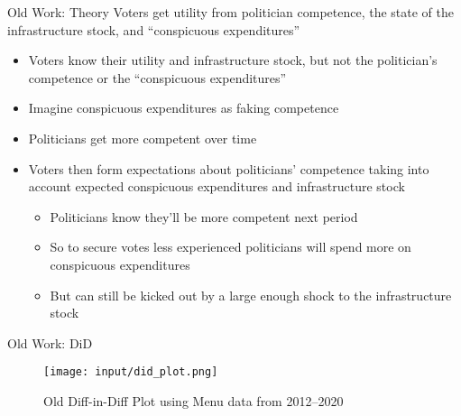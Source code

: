 \begin{frame}{Old Work: Theory}
    Voters get utility from politician competence, the state of the infrastructure stock, and ``conspicuous expenditures''
    \begin{itemize}
        \item Voters know their utility and infrastructure stock, but not the politician's competence or the ``conspicuous expenditures''
        \item Imagine conspicuous expenditures as faking competence
        \item Politicians get more competent over time
        \item Voters then form expectations about politicians' competence taking into account expected conspicuous expenditures and infrastructure stock
        \begin{itemize}
            \item Politicians know they'll be more competent next period
            \item So to secure votes less experienced politicians will spend more on conspicuous expenditures
            \item But can still be kicked out by a large enough shock to the infrastructure stock
        \end{itemize}
    \end{itemize}
\end{frame}

\begin{frame}{Old Work: DiD}
    
\begin{figure}
    \centering
    \texttt{[image: input/did\_plot.png]}
    \caption{Old Diff-in-Diff Plot using Menu data from 2012--2020}
\end{figure}
\end{frame}